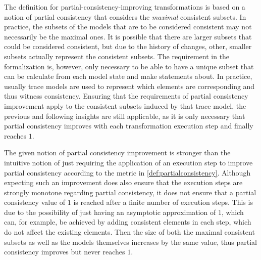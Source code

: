 \begin{remark}
    The definition for partial-consistency-improving transformations is based on a notion of partial consistency that considers the \emph{maximal} consistent subsets.
    In practice, the subsets of the models that are to be considered consistent may not necessarily be the maximal ones.
    It is possible that there are larger subsets that could be considered consistent, but due to the history of changes, other, smaller subsets actually represent the consistent subsets.
    The requirement in the formalization is, however, only necessary to be able to have a unique subset that can be calculate from each model state and make statements about.
    In practice, usually trace models are used to represent which elements are corresponding and thus witness consistency.
    Ensuring that the requirements of partial consistency improvement apply to the consistent subsets induced by that trace model, the previous and following insights are still applicable, as it is only necessary that partial consistency improves with each transformation execution step and finally reaches $1$.
\end{remark}

The given notion of partial consistency improvement is stronger than the intuitive notion of just requiring the application of an execution step to improve partial consistency according to the metric in \autoref{def:partialconsistency}.
Although expecting such an improvement does also ensure that the execution steps are strongly monotone regarding partial consistency, it does not ensure that a partial consistency value of $1$ is reached after a finite number of execution steps.
This is due to the possibility of just having an asymptotic approximation of $1$, which can, for example, be achieved by adding consistent elements in each step, which do not affect the existing elements.
Then the size of both the maximal consistent subsets as well as the models themselves increases by the same value, thus partial consistency improves but never reaches $1$.

